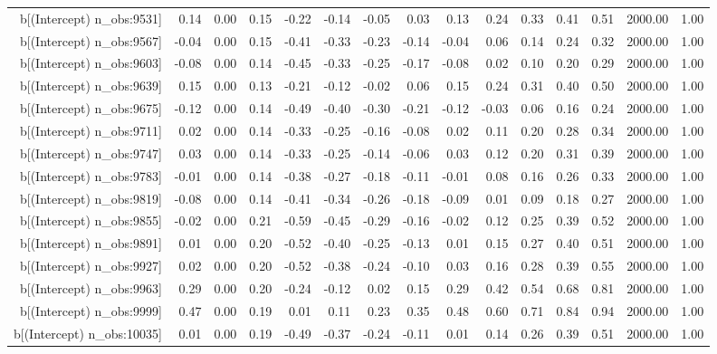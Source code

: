 \begin{table}[ht]
\begin{tabular}{rrrrrrrrrrrrrrr}
  b[(Intercept) n\_obs:9531] & 0.14 & 0.00 & 0.15 & -0.22 & -0.14 & -0.05 & 0.03 & 0.13 & 0.24 & 0.33 & 0.41 & 0.51 & 2000.00 & 1.00 \\ 
  b[(Intercept) n\_obs:9567] & -0.04 & 0.00 & 0.15 & -0.41 & -0.33 & -0.23 & -0.14 & -0.04 & 0.06 & 0.14 & 0.24 & 0.32 & 2000.00 & 1.00 \\ 
  b[(Intercept) n\_obs:9603] & -0.08 & 0.00 & 0.14 & -0.45 & -0.33 & -0.25 & -0.17 & -0.08 & 0.02 & 0.10 & 0.20 & 0.29 & 2000.00 & 1.00 \\ 
  b[(Intercept) n\_obs:9639] & 0.15 & 0.00 & 0.13 & -0.21 & -0.12 & -0.02 & 0.06 & 0.15 & 0.24 & 0.31 & 0.40 & 0.50 & 2000.00 & 1.00 \\ 
  b[(Intercept) n\_obs:9675] & -0.12 & 0.00 & 0.14 & -0.49 & -0.40 & -0.30 & -0.21 & -0.12 & -0.03 & 0.06 & 0.16 & 0.24 & 2000.00 & 1.00 \\ 
  b[(Intercept) n\_obs:9711] & 0.02 & 0.00 & 0.14 & -0.33 & -0.25 & -0.16 & -0.08 & 0.02 & 0.11 & 0.20 & 0.28 & 0.34 & 2000.00 & 1.00 \\ 
  b[(Intercept) n\_obs:9747] & 0.03 & 0.00 & 0.14 & -0.33 & -0.25 & -0.14 & -0.06 & 0.03 & 0.12 & 0.20 & 0.31 & 0.39 & 2000.00 & 1.00 \\ 
  b[(Intercept) n\_obs:9783] & -0.01 & 0.00 & 0.14 & -0.38 & -0.27 & -0.18 & -0.11 & -0.01 & 0.08 & 0.16 & 0.26 & 0.33 & 2000.00 & 1.00 \\ 
  b[(Intercept) n\_obs:9819] & -0.08 & 0.00 & 0.14 & -0.41 & -0.34 & -0.26 & -0.18 & -0.09 & 0.01 & 0.09 & 0.18 & 0.27 & 2000.00 & 1.00 \\ 
  b[(Intercept) n\_obs:9855] & -0.02 & 0.00 & 0.21 & -0.59 & -0.45 & -0.29 & -0.16 & -0.02 & 0.12 & 0.25 & 0.39 & 0.52 & 2000.00 & 1.00 \\ 
  b[(Intercept) n\_obs:9891] & 0.01 & 0.00 & 0.20 & -0.52 & -0.40 & -0.25 & -0.13 & 0.01 & 0.15 & 0.27 & 0.40 & 0.51 & 2000.00 & 1.00 \\ 
  b[(Intercept) n\_obs:9927] & 0.02 & 0.00 & 0.20 & -0.52 & -0.38 & -0.24 & -0.10 & 0.03 & 0.16 & 0.28 & 0.39 & 0.55 & 2000.00 & 1.00 \\ 
  b[(Intercept) n\_obs:9963] & 0.29 & 0.00 & 0.20 & -0.24 & -0.12 & 0.02 & 0.15 & 0.29 & 0.42 & 0.54 & 0.68 & 0.81 & 2000.00 & 1.00 \\ 
  b[(Intercept) n\_obs:9999] & 0.47 & 0.00 & 0.19 & 0.01 & 0.11 & 0.23 & 0.35 & 0.48 & 0.60 & 0.71 & 0.84 & 0.94 & 2000.00 & 1.00 \\ 
  b[(Intercept) n\_obs:10035] & 0.01 & 0.00 & 0.19 & -0.49 & -0.37 & -0.24 & -0.11 & 0.01 & 0.14 & 0.26 & 0.39 & 0.51 & 2000.00 & 1.00 \\ 

\end{tabular}
\end{table}

